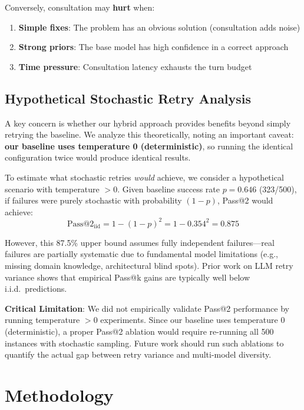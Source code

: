\documentclass[11pt,a4paper]{article}
\begin{document}
Conversely, consultation may \textbf{hurt} when:
\begin{enumerate}
    \item \textbf{Simple fixes}: The problem has an obvious solution (consultation adds noise)
    \item \textbf{Strong priors}: The base model has high confidence in a correct approach
    \item \textbf{Time pressure}: Consultation latency exhausts the turn budget
\end{enumerate}

\subsection{Hypothetical Stochastic Retry Analysis}

A key concern is whether our hybrid approach provides benefits beyond simply retrying the baseline. We analyze this theoretically, noting an important caveat: \textbf{our baseline uses temperature 0 (deterministic)}, so running the identical configuration twice would produce identical results.

To estimate what stochastic retries \textit{would} achieve, we consider a hypothetical scenario with temperature $> 0$. Given baseline success rate $p = 0.646$ (323/500), if failures were purely stochastic with probability $(1-p)$, Pass@2 would achieve:
\begin{equation}
\text{Pass@2}_{\text{iid}} = 1 - (1-p)^2 = 1 - 0.354^2 = 0.875
\end{equation}

However, this 87.5\% upper bound assumes fully independent failures---real failures are partially systematic due to fundamental model limitations (e.g., missing domain knowledge, architectural blind spots). Prior work on LLM retry variance \citep{brown2024monkeys} shows that empirical Pass@k gains are typically well below i.i.d.\ predictions.

\textbf{Critical Limitation}: We did not empirically validate Pass@2 performance by running temperature $> 0$ experiments. Since our baseline uses temperature 0 (deterministic), a proper Pass@2 ablation would require re-running all 500 instances with stochastic sampling. Future work should run such ablations to quantify the actual gap between retry variance and multi-model diversity.

\section{Methodology}
\end{document}
